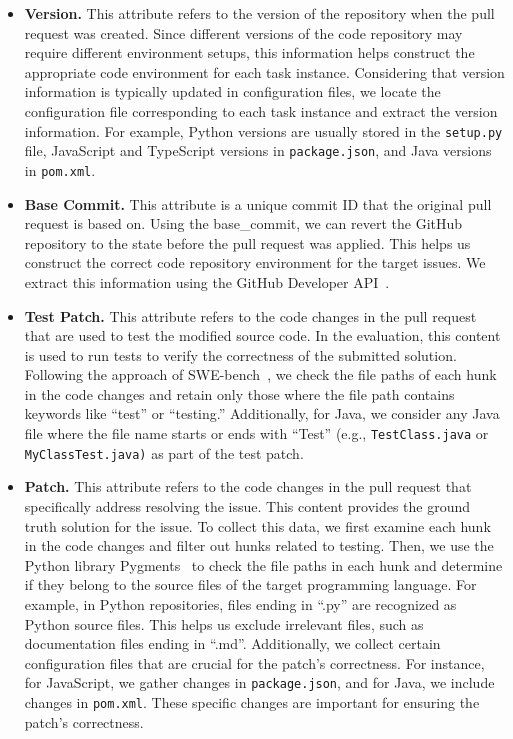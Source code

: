 \begin{itemize}[left=10pt]
    
    \item \textbf{Version.} This attribute refers to the version of the repository when the pull request was created. Since different versions of the code repository may require different environment setups, this information helps construct the appropriate code environment for each task instance. Considering that version information is typically updated in configuration files, we locate the configuration file corresponding to each task instance and extract the version information. For example, Python versions are usually stored in the \texttt{setup.py} file, JavaScript and TypeScript versions in \texttt{package.json}, and Java versions in \texttt{pom.xml}.
    \item \textbf{Base Commit.} This attribute is a unique commit ID that the original pull request is based on. Using the base\_commit, we can revert the GitHub repository to the state before the pull request was applied. This helps us construct the correct code repository environment for the target issues. We extract this information using the GitHub Developer API~\cite{github-rest-api}.
      \item \textbf{Test Patch.} This attribute refers to the code changes in the pull request that are used to test the modified source code. In the evaluation, this content is used to run tests to verify the correctness of the submitted solution. Following the approach of SWE-bench~\cite{jimenez2023swe}, we check the file paths of each hunk in the code changes and retain only those where the file path contains keywords like ``test'' or ``testing.'' Additionally, for Java, we consider any Java file where the file name starts or ends with ``Test'' (e.g., \texttt{TestClass.java} or \texttt{MyClassTest.java)} as part of the test patch.
    \item \textbf{Patch.} This attribute refers to the code changes in the pull request that specifically address resolving the issue. This content provides the ground truth solution for the issue. To collect this data, we first examine each hunk in the code changes and filter out hunks related to testing. Then, we use the Python library Pygments~\cite{pygments} to check the file paths in each hunk and determine if they belong to the source files of the target programming language. For example, in Python repositories, files ending in ``.py'' are recognized as Python source files. This helps us exclude irrelevant files, such as documentation files ending in ``.md''. Additionally, we collect certain configuration files that are crucial for the patch’s correctness. For instance, for JavaScript, we gather changes in \texttt{package.json}, and for Java, we include changes in \texttt{pom.xml}. These specific changes are important for ensuring the patch's correctness.
    

\end{itemize}
